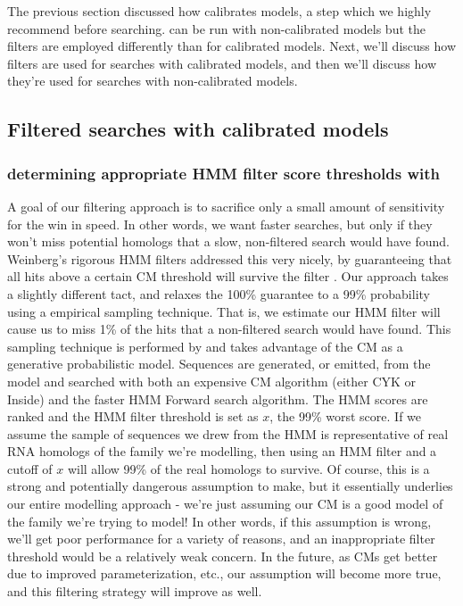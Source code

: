 The previous section discussed how  calibrates
models, a step which we highly recommend before searching.
 can be run with non-calibrated models but the 
filters are employed differently than for calibrated models.  Next,
we'll discuss how filters are used for searches with calibrated
models, and then we'll discuss how they're used for searches with
non-calibrated models.

\subsection{Filtered searches with calibrated models}

\subsubsection{determining appropriate HMM filter score thresholds with }
A goal of our filtering approach is to sacrifice only a small amount
of sensitivity for the win in speed. In other words, we want faster
searches, but only if they won't miss potential homologs that a slow,
non-filtered search would have found.  Weinberg's rigorous HMM filters
addressed this very nicely, by guaranteeing that all hits above a
certain CM threshold will survive the filter
\cite{WeinbergRuzzo04}. Our approach takes a slightly different tact,
and relaxes the 100\% guarantee to a 99\% probability using a
empirical sampling technique. That is, we estimate our HMM filter will
cause us to miss 1\% of the hits that a non-filtered search would have
found. This sampling technique is performed by  and
takes advantage of the CM as a generative probabilistic model.
Sequences are generated, or emitted, from the model and searched with
both an expensive CM algorithm (either CYK or Inside) and the faster
HMM Forward search algorithm. The HMM scores are ranked and the HMM
filter threshold is set as $x$, the 99\% worst score. If we assume
the sample of sequences we drew from the HMM is representative of real
RNA homologs of the family we're modelling, then using an HMM filter
and a cutoff of $x$ will allow 99\% of the real homologs to
survive. Of course, this is a strong and potentially dangerous
assumption to make, but it essentially underlies our entire modelling
approach - we're just assuming our CM is a good model of the family
we're trying to model!  In other words, if this assumption is wrong,
we'll get poor performance for a variety of reasons, and an
inappropriate filter threshold would be a relatively weak concern.  In
the future, as CMs get better due to improved parameterization, etc.,
our assumption will become more true, and this filtering strategy will
improve as well. 

